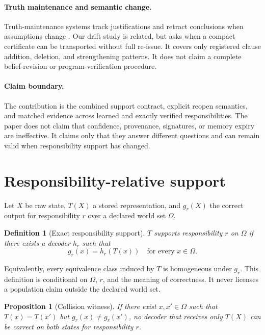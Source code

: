 \documentclass[10pt]{article}
\newtheorem{definition}{Definition}
\newtheorem{proposition}{Proposition}
\begin{document}
\paragraph{Truth maintenance and semantic change.}
Truth-maintenance systems track justifications and retract conclusions when assumptions change \citep{doyle1979truth,dekleer1986assumption}. Our drift study is related, but asks when a compact certificate can be transported without full re-issue. It covers only registered clause addition, deletion, and strengthening patterns. It does not claim a complete belief-revision or program-verification procedure.

\paragraph{Claim boundary.}
The contribution is the combined support contract, explicit reopen semantics, and matched evidence across learned and exactly verified responsibilities. The paper does not claim that confidence, provenance, signatures, or memory expiry are ineffective. It claims only that they answer different questions and can remain valid when responsibility support has changed.

\section{Responsibility-relative support}

Let $X$ be raw state, $T(X)$ a stored representation, and $g_r(X)$ the correct output for responsibility $r$ over a declared world set $\Omega$.

\begin{definition}[Exact responsibility support]
$T$ supports responsibility $r$ on $\Omega$ if there exists a decoder $h_r$ such that
\[
g_r(x)=h_r(T(x)) \quad \text{for every }x\in\Omega.
\]
\end{definition}

Equivalently, every equivalence class induced by $T$ is homogeneous under $g_r$. This definition is conditional on $\Omega$, $r$, and the meaning of correctness. It never licenses a population claim outside the declared world set.

\begin{proposition}[Collision witness]
If there exist $x,x'\in\Omega$ such that $T(x)=T(x')$ but $g_r(x)\neq g_r(x')$, no decoder that receives only $T(X)$ can be correct on both states for responsibility $r$.
\end{proposition}
\end{document}
